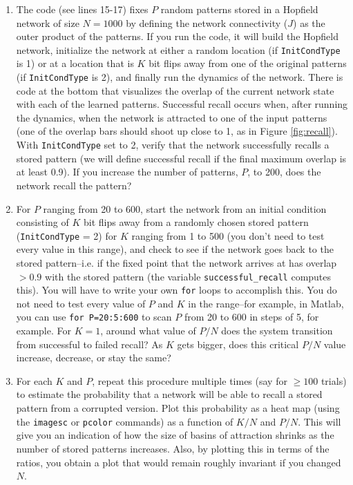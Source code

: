 \documentclass[letterpaper,11pt]{article}
\begin{document}
\begin{enumerate}
  \item The code (see lines 15-17) fixes $P$ random patterns stored in a Hopfield network of size $N=1000$ by defining the network connectivity ($J$) as the outer product of the patterns. If you run the code, it will build the Hopfield network, initialize the network at either a random location (if \texttt{InitCondType} is 1) or at a location that is $K$ bit flips away from one of the original patterns (if \texttt{InitCondType} is 2), and finally run the dynamics of the network. There is code at the bottom that visualizes the overlap of the current network state with each of the learned patterns. Successful recall occurs when, after running the dynamics, when the network is attracted to one of the input patterns (one of the overlap bars should shoot up close to 1, as in Figure \ref{fig:recall}). With \texttt{InitCondType} set to 2, verify that the network successfully recalls a stored pattern (we will define successful recall if the final maximum overlap is at least 0.9). If you increase the number of patterns, $P$, to 200, does the network recall the pattern?
  \item For $P$ ranging from 20 to 600, start the network from an initial condition consisting of $K$ bit flips away from a randomly chosen stored pattern (\texttt{InitCondType} = 2) for $K$ ranging from 1 to 500 (you don't need to test every value in this range), and check to see if the network goes back to the stored pattern--i.e. if the fixed point that the network arrives at has overlap $> 0.9$ with the stored pattern (the variable \texttt{successful\_recall} computes this). You will have to write your own \texttt{for} loops to accomplish this. You do not need to test every value of $P$ and $K$ in the range--for example, in Matlab, you can use \texttt{for P=20:5:600} to scan $P$ from 20 to 600 in steps of 5, for example. For $K=1$, around what value of $P/N$ does the system transition from successful to failed recall? As $K$ gets bigger, does this critical $P/N$ value increase, decrease, or stay the same?
  \item For each $K$ and $P$, repeat this procedure multiple times (say for $\geq 100$ trials) to estimate the probability that a network will be able to recall a stored pattern from a corrupted version. Plot this probability as a heat map (using the \texttt{imagesc} or \texttt{pcolor} commands) as a function of $K/N$ and $P/N$. This will give you an indication of how the size of basins of attraction shrinks as the number of stored patterns increases. Also, by plotting this in terms of the ratios, you obtain a plot that would remain roughly invariant if you changed $N$.

\end{enumerate}
\end{document}
